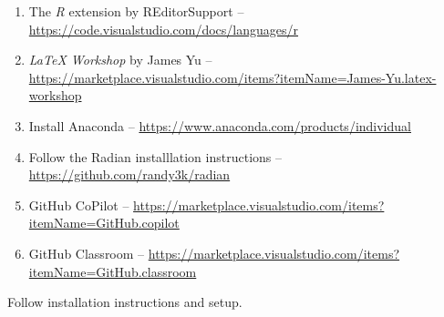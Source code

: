 \documentclass[12pt,english]{exam}
\begin{document}
\begin{enumerate}
  \item The \textit{R} extension by REditorSupport -- \url{https://code.visualstudio.com/docs/languages/r}
  \item \textit{LaTeX Workshop} by James Yu -- \url{https://marketplace.visualstudio.com/items?itemName=James-Yu.latex-workshop}
  \item Install Anaconda -- \url{https://www.anaconda.com/products/individual}
  \item Follow the Radian installlation instructions -- \url{https://github.com/randy3k/radian}
  \item GitHub CoPilot -- \url{https://marketplace.visualstudio.com/items?itemName=GitHub.copilot}
  \item GitHub Classroom -- \url{https://marketplace.visualstudio.com/items?itemName=GitHub.classroom}
\end{enumerate}

Follow installation instructions and setup. 
\end{document}
